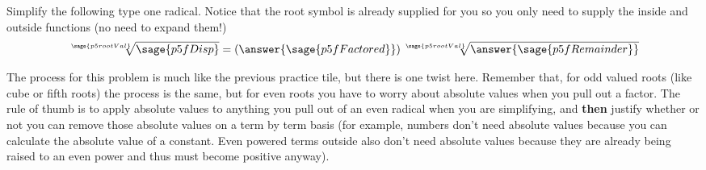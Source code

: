 \documentclass{ximera}
\begin{document}
\begin{problem}
    Simplify the following type one radical. Notice that the root symbol is already supplied for you so you only need to supply the inside and outside functions (no need to expand them!)
    \[
        \sqrt[\sage{p5rootVal}]{\sage{p5fDisp}} = \left(\answer{\sage{p5fFactored}}\right)\sqrt[\sage{p5rootVal}]{\answer{\sage{p5fRemainder}}}
    \]
    \begin{feedback}
        The process for this problem is much like the previous practice tile, but there is one twist here. Remember that, for odd valued roots (like cube or fifth roots) the process is the same, but for even roots you have to worry about absolute values when you pull out a factor. The rule of thumb is to apply absolute values to anything you pull out of an even radical when you are simplifying, and \textbf{then} justify whether or not you can remove those absolute values on a term by term basis (for example, numbers don't need absolute values because you can calculate the absolute value of a constant. Even powered terms outside also don't need absolute values because they are already being raised to an even power and thus must become positive anyway).
    \end{feedback}
\end{problem}
\end{document}
